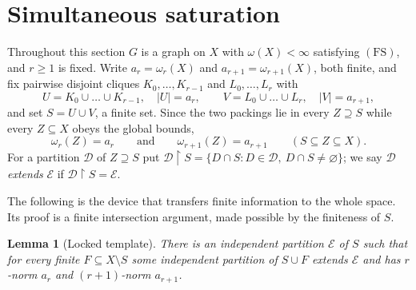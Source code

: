 \documentclass[11pt,reqno]{amsart}
\theoremstyle{plain}
\newtheorem{lemma}[theorem]{Lemma}
\theoremstyle{definition}
\theoremstyle{remark}
\newcommand{\restr}{\mathbin{\upharpoonright}}
\newcommand{\cl}{\omega}
\begin{document}
\section{Simultaneous saturation}
\label{sec:saturation}

Throughout this section $G$ is a graph on $X$ with $\cl(X)<\infty$ satisfying
$\mathrm{(FS)}$, and $r\ge1$ is fixed. Write $a_r=\cl_r(X)$ and
$a_{r+1}=\cl_{r+1}(X)$, both finite, and fix pairwise disjoint cliques
$K_0,\dots,K_{r-1}$ and $L_0,\dots,L_r$ with
\[
U=K_0\cup\dots\cup K_{r-1},\quad |U|=a_r,
\qquad
V=L_0\cup\dots\cup L_r,\quad |V|=a_{r+1},
\]
and set $S=U\cup V$, a finite set. Since the two packings lie in every
$Z\supseteq S$ while every $Z\subseteq X$ obeys the global bounds,
\begin{equation}
\cl_r(Z)=a_r
\qquad\text{and}\qquad
\cl_{r+1}(Z)=a_{r+1}
\qquad (S\subseteq Z\subseteq X).
\label{eq:norms-stable}
\end{equation}
For a partition $\mathcal D$ of $Z\supseteq S$ put
$\mathcal D\restr S=\{D\cap S:D\in\mathcal D,\ D\cap S\neq\varnothing\}$; we say
$\mathcal D$ \emph{extends} $\mathcal E$ if $\mathcal D\restr S=\mathcal E$.

The following is the device that transfers finite information to the whole
space. Its proof is a finite intersection argument, made possible by the
finiteness of $S$.

\begin{lemma}[Locked template]
\label{lem:locked}
There is an independent partition $\mathcal E$ of $S$ such that for every
finite $F\subseteq X\setminus S$ some independent partition of $S\cup F$
extends $\mathcal E$ and has $r$-norm $a_r$ and $(r{+}1)$-norm $a_{r+1}$.
\end{lemma}
\end{document}
